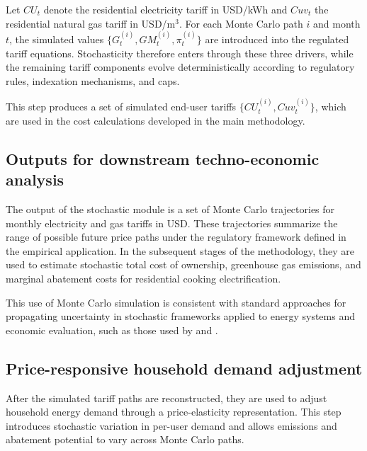 \documentclass[authoryear,preprint,review,10pt]{elsarticle}
\begin{document}
Let $CU_t$ denote the residential electricity tariff in USD/kWh and $Cuv_t$ the residential natural gas tariff in USD/m$^3$. For each Monte Carlo path $i$ and month $t$, the simulated values $\{G_t^{(i)}, GM_t^{(i)}, \pi_t^{(i)}\}$ are introduced into the regulated tariff equations. Stochasticity therefore enters through these three drivers, while the remaining tariff components evolve deterministically according to regulatory rules, indexation mechanisms, and caps.

This step produces a set of simulated end-user tariffs $\{CU_t^{(i)}, Cuv_t^{(i)}\}$, which are used in the cost calculations developed in the main methodology.

\subsection{Outputs for downstream techno-economic analysis}
\label{appendix:outputs}

The output of the stochastic module is a set of Monte Carlo trajectories for monthly electricity and gas tariffs in USD. These trajectories summarize the range of possible future price paths under the regulatory framework defined in the empirical application. In the subsequent stages of the methodology, they are used to estimate stochastic total cost of ownership, greenhouse gas emissions, and marginal abatement costs for residential cooking electrification.

This use of Monte Carlo simulation is consistent with standard approaches for propagating uncertainty in stochastic frameworks applied to energy systems and economic evaluation, such as those used by \citet{khamis2020} and \citet{babu2015}.

\subsection{Price-responsive household demand adjustment}
\label{appendix:demand_adjustment}

After the simulated tariff paths are reconstructed, they are used to adjust household energy demand through a price-elasticity representation. This step introduces stochastic variation in per-user demand and allows emissions and abatement potential to vary across Monte Carlo paths.
\end{document}

